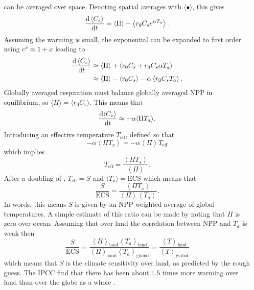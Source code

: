  can be averaged over space. Denoting spatial averages with $\langle \bullet \rangle$, this gives
\begin{equation}
  \label{eq:spatially_averaged_soil_carbon}
  \dv{\left\langle C_s\right\rangle}{t} = \left\langle \Pi \right \rangle - \left\langle r_0 C_s e^{\alpha T_a} \right \rangle.
\end{equation}
Assuming the warming is small, the exponential can be expanded to first order using $e^x \approx 1 + x$ leading to
\begin{align*}
  \dv{\left\langle C_s\right\rangle}{t} &\approx \left\langle \Pi \right \rangle  + \left\langle r_0 C_s + r_0 C_s \alpha T_a \right \rangle \\
                                        &\approx \left\langle \Pi \right \rangle - \left\langle r_0 C_s\right \rangle - \alpha \left \langle r_0C_s T_a\right\rangle.
\end{align*}
Globally averaged respiration must balance globally averaged NPP in equilibrium, so $\langle \Pi \rangle = \langle r_0 C_s \rangle$. This means that
\begin{equation}
  \label{eq:soil_carbon_linearised}
  \dv{\langle C_s\rangle}{t} \approx -\alpha \langle \Pi T_a \rangle.
\end{equation}
Introducing an effective temperature $T_{\mathrm{eff}}$, defined so that
\begin{equation}
  \label{eq:motivation_of_effective_temperature}
  - \alpha \left \langle \Pi T_a \right\rangle = - \alpha \left \langle \Pi \right\rangle T_{\mathrm{eff}}
\end{equation}
which implies
\begin{equation}
  \label{eq:definition_of_effective_temperature}
  T_{\mathrm{eff}} = \frac{\left \langle \Pi T_s \right\rangle}{\left \langle \Pi \right\rangle}.
\end{equation}
After a doubling of , $T_{\mathrm{eff}} = S$ and $\langle T_a \rangle = \mathrm{ECS}$ which means that
\begin{equation}
  \label{eq:S_vs_ECS}
  \frac{S}{\mathrm{ECS}} = \frac{\left \langle \Pi T_a \right\rangle}{\left \langle \Pi \right\rangle \left \langle T_a \right \rangle}.
\end{equation}
In words, this means $S$ is given by an NPP weighted average of global temperatures. A simple estimate of this ratio can be made by noting that $\Pi$ is zero over ocean.
Assuming that over land the correlation between NPP and $T_a$ is weak then
\begin{equation}
  \label{eq:S_vs_ECS_land_ocean}
  \frac{S}{\mathrm{ECS}}
  = \frac{\left\langle \Pi\right\rangle_{\mathrm{land}} \left\langle T_a \right\rangle_{\mathrm{land}}}{\left \langle \Pi \right\rangle_{\mathrm{land}} \left \langle T_a \right \rangle_{\mathrm{global}}}
  = \frac{\left\langle T\right\rangle_{\mathrm{land}}}{\left\langle T \right\rangle_{\mathrm{global}}}
\end{equation}
which means that $S$ is the climate sensitivity over land, as predicted by the rough guess. The IPCC find that there has been about $1.5$ times more warming over land than over the globe
as a whole \parencite{AR6}.

